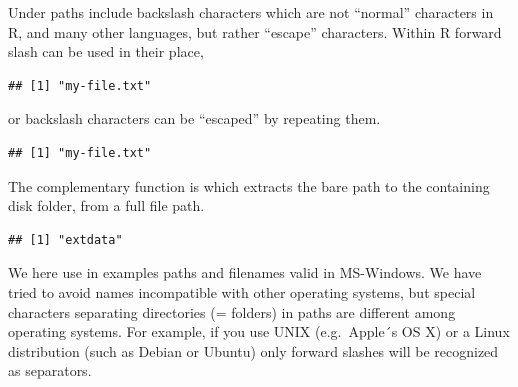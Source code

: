 \documentclass[krantz2,ChapterTOCs]{krantz}\usepackage{knitr}
\begin{document}
Under  paths include backslash characters which are not ``normal'' characters in R, and many other languages, but rather ``escape'' characters. Within R forward slash can be used in their place,

\begin{knitrout}\footnotesize
{}\color{fgcolor}\begin{kframe}
\begin{alltt}
\hlstd{(}\hlstd{)}
\end{alltt}
\begin{verbatim}
## [1] "my-file.txt"
\end{verbatim}
\end{kframe}
\end{knitrout}

or backslash characters can be ``escaped'' by repeating them.
\begin{knitrout}\footnotesize
{}\color{fgcolor}\begin{kframe}
\begin{alltt}
\hlstd{(}\hlstd{)}
\end{alltt}
\begin{verbatim}
## [1] "my-file.txt"
\end{verbatim}
\end{kframe}
\end{knitrout}

The complementary function is  which extracts the bare path to the containing disk folder, from a full file path.
\begin{knitrout}\footnotesize
{}\color{fgcolor}\begin{kframe}
\begin{alltt}
\hlstd{(}\hlstd{)}
\end{alltt}
\begin{verbatim}
## [1] "extdata"
\end{verbatim}
\end{kframe}
\end{knitrout}

\begin{warningbox}
We here use in examples paths and filenames valid in MS-Windows. We have tried to avoid names incompatible with other operating systems, but special characters separating directories (= folders) in paths are different among operating systems. For example, if you use UNIX (e.g.\ Apple´s OS X) or a Linux distribution (such as Debian or Ubuntu) only forward slashes will be recognized as separators.
\end{warningbox}
\end{document}
